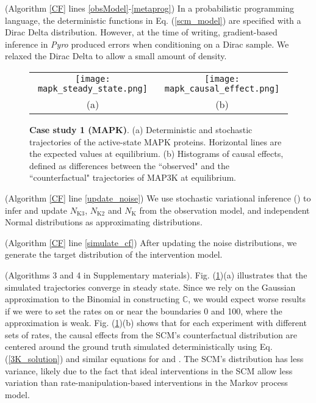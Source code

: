 \documentclass{article}
\def\eqref#1{Eq. (\ref{#1})}
\def\figref#1{Fig. (\ref{#1})}
\begin{document}
 (Algorithm \ref{CF} lines \ref{obsModel}-\ref{metaprog}) In a probabilistic programming language, the deterministic functions in  \eqref{scm_model} are specified with a Dirac Delta distribution. However, at the time of writing, gradient-based inference in \emph{Pyro} produced errors when conditioning on a Dirac sample. We relaxed the Dirac Delta to allow a small amount of density.
\vspace{-4mm}
\begin{figure}[htbp!]
\begin{center}
\begin{tabular}{cc}
\texttt{[image: mapk\_steady\_state.png]} &
\texttt{[image: mapk\_causal\_effect.png]} \\
(a) & (b)
\end{tabular}
\end{center}
\vspace{-.15in}
    \caption{\small \textbf{Case study 1 (MAPK)}. (a) Deterministic and stochastic trajectories of the active-state MAPK proteins. Horizontal lines are the expected values at equilibrium. (b) Histograms of causal effects, defined as differences between the ``observed" and the ``counterfactual" trajectories of $\text{MAP3K}$ at equilibrium.\label{fig:MapkSteadyState}}
 \vspace{-3mm}   
 \end{figure}

 (Algorithm \ref{CF} line \ref{update_noise})
We use stochastic variational inference (\cite{2012arXiv1206.7051H}) to infer and update $N_{\text{K3}}$, $N_{\text{K2}}$ and $N_{\text{K}}$ from the observation model, and independent Normal distributions as approximating distributions.

 (Algorithm \ref{CF} line \ref{simulate_cf})
After updating the noise distributions, we generate the target distribution of the intervention model.

 (Algorithms 3 and 4 in Supplementary materials). \figref{fig:MapkSteadyState}(a) illustrates that the simulated trajectories converge in steady state. Since we rely on the Gaussian approximation to the Binomial in constructing $\mathbb{C}$, we would expect worse results if we were to set the rates  on or near the boundaries 0 and 100, where the approximation is weak.  \figref{fig:MapkSteadyState}(b) shows that for each experiment with different sets of rates, the causal effects from the SCM's counterfactual distribution are centered around the ground truth simulated deterministically using \eqref{3K_solution} and similar equations for  and . The SCM's distribution has less variance, likely due to the fact that ideal interventions in the SCM allow less variation than rate-manipulation-based interventions in the Markov process model.
\end{document}
